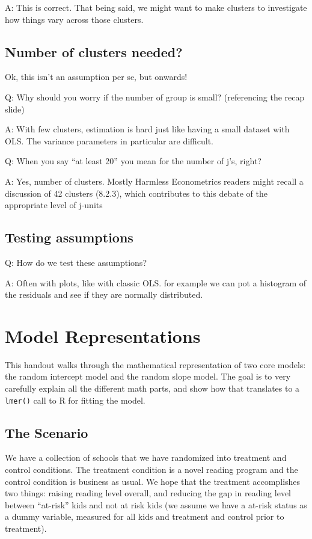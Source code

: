 \documentclass[
  letterpaper,
  DIV=11,
  numbers=noendperiod]{scrreprt}
\begin{document}
A: This is correct. That being said, we might want to make clusters to
investigate how things vary across those clusters.

\section{Number of clusters needed?}\label{number-of-clusters-needed}

Ok, this isn't an assumption per se, but onwards!

Q: Why should you worry if the number of group is small? (referencing
the recap slide)

A: With few clusters, estimation is hard just like having a small
dataset with OLS. The variance parameters in particular are difficult.

Q: When you say ``at least 20'' you mean for the number of j's, right?

A: Yes, number of clusters. Mostly Harmless Econometrics readers might
recall a discussion of 42 clusters (8.2.3), which contributes to this
debate of the appropriate level of j-units

\section{Testing assumptions}\label{testing-assumptions}

Q: How do we test these assumptions?

A: Often with plots, like with classic OLS. for example we can pot a
histogram of the residuals and see if they are normally distributed.

\chapter{Model Representations}\label{model-representations}

This handout walks through the mathematical representation of two core
models: the random intercept model and the random slope model. The goal
is to very carefully explain all the different math parts, and show how
that translates to a \texttt{lmer()} call to R for fitting the model.

\section{The Scenario}\label{the-scenario}

We have a collection of schools that we have randomized into treatment
and control conditions. The treatment condition is a novel reading
program and the control condition is business as usual. We hope that the
treatment accomplishes two things: raising reading level overall, and
reducing the gap in reading level between ``at-risk'' kids and not at
risk kids (we assume we have a at-risk status as a dummy variable,
measured for all kids and treatment and control prior to treatment).
\end{document}
